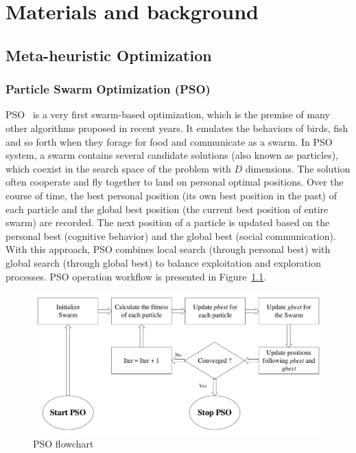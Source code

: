 \documentclass[a4paper,13pt,2p]{report}
\begin{document}
	 

\chapter{Materials and background}
\label{ch:background}


\section{Meta-heuristic Optimization}
\label{sec:meta_heuristic}	
	
\subsection{Particle Swarm Optimization (PSO)}
\label{pso_standard}
PSO~\cite{kennedy2010particle} is a very first swarm-based optimization, which is the premise of many other algorithms proposed in recent years. It emulates the behaviors of birds, fish and so forth when they forage for food and communicate as a swarm. In PSO system, a swarm contains several candidate solutions (also known as particles), which coexist in the search space of the problem with $D$ dimensions. The solution often cooperate and fly together to land on personal optimal positions. Over the course of time, the best personal position (its own best position in the past) of each particle and the global best position (the current best position of entire swarm) are recorded. The next position of a particle is updated based on the personal best (cognitive behavior) and the global best (social communication). With this approach, PSO combines local search (through personal best) with global search (through global best) to balance exploitation and exploration processes. PSO operation workflow is presented in Figure~\ref{fig_pso_algo}.
	 
\begin{figure}[!ht] 
   \centering
   \includegraphics[width=0.75\linewidth]{pdf/model/pso}
  \caption{PSO flowchart} 
  \label{fig_pso_algo} 
\end{figure}
	 
\end{document}
